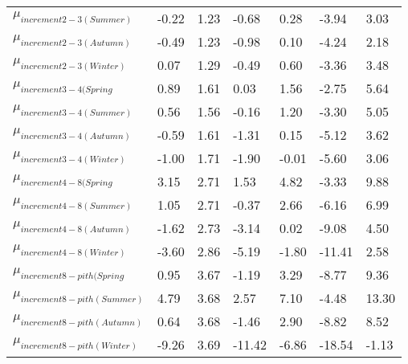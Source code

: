 \documentclass{article}\usepackage[]{graphicx}\usepackage[]{color}
\begin{document}
\begin{table}[ht]
\begin{tabular}{|p{}|p{}|p{}|p{}|p{}|p{}|p{}|}
  $\mu_{increment 2-3 (Summer)}$ & -0.22 & 1.23 & -0.68 & 0.28 & -3.94 & 3.03 \\ 
  $\mu_{increment 2-3 (Autumn)}$ & -0.49 & 1.23 & -0.98 & 0.10 & -4.24 & 2.18 \\ 
  $\mu_{increment 2-3 (Winter)}$ & 0.07 & 1.29 & -0.49 & 0.60 & -3.36 & 3.48 \\ 
  $\mu_{increment 3-4 (Spring}$ & 0.89 & 1.61 & 0.03 & 1.56 & -2.75 & 5.64 \\ 
  $\mu_{increment 3-4 (Summer)}$ & 0.56 & 1.56 & -0.16 & 1.20 & -3.30 & 5.05 \\ 
  $\mu_{increment 3-4 (Autumn)}$ & -0.59 & 1.61 & -1.31 & 0.15 & -5.12 & 3.62 \\ 
  $\mu_{increment 3-4 (Winter)}$ & -1.00 & 1.71 & -1.90 & -0.01 & -5.60 & 3.06 \\ 
  $\mu_{increment 4-8 (Spring}$ & 3.15 & 2.71 & 1.53 & 4.82 & -3.33 & 9.88 \\ 
  $\mu_{increment 4-8 (Summer)}$ & 1.05 & 2.71 & -0.37 & 2.66 & -6.16 & 6.99 \\ 
  $\mu_{increment 4-8 (Autumn)}$ & -1.62 & 2.73 & -3.14 & 0.02 & -9.08 & 4.50 \\ 
  $\mu_{increment 4-8 (Winter)}$ & -3.60 & 2.86 & -5.19 & -1.80 & -11.41 & 2.58 \\ 
  $\mu_{increment 8-pith (Spring}$ & 0.95 & 3.67 & -1.19 & 3.29 & -8.77 & 9.36 \\ 
  $\mu_{increment 8-pith (Summer)}$ & 4.79 & 3.68 & 2.57 & 7.10 & -4.48 & 13.30 \\ 
  $\mu_{increment 8-pith (Autumn)}$ & 0.64 & 3.68 & -1.46 & 2.90 & -8.82 & 8.52 \\ 
  $\mu_{increment 8-pith (Winter)}$ & -9.26 & 3.69 & -11.42 & -6.86 & -18.54 & -1.13 \\ 
   \hline
\end{tabular}
\endgroup
\end{table}
\end{document}
